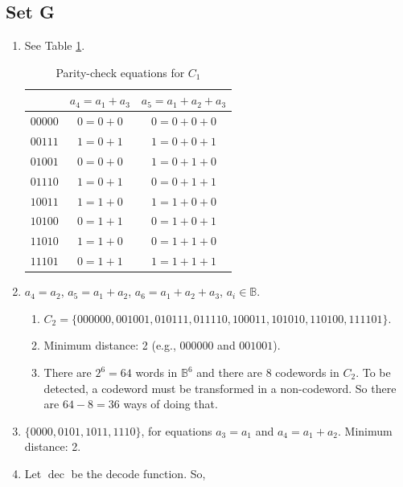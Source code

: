 \documentclass{article}
\DeclareMathOperator{\dec}{dec}
\begin{document}
\subsection{Set G}
\begin{enumerate}
    \item See Table \ref{tab:parity-c1}.
        \begin{table}[!hb]
            \centering
            \begin{tabular}{c|c|c}
                                        & $a_4 = a_1 + a_3$ & $a_5 = a_1 + a_2 + a_3$ \\ \hline
            $00000$ & $0 = 0 + 0$       & $0 = 0 + 0 + 0$         \\
            $00111$ & $1 = 0 + 1$       & $1 = 0 + 0 + 1$         \\
            $01001$ & $0 = 0 + 0$       & $1 = 0 + 1 + 0$         \\
            $01110$ & $1 = 0 + 1$       & $0 = 0 + 1 + 1$         \\
            $10011$ & $1 = 1 + 0$       & $1 = 1 + 0 + 0$         \\
            $10100$ & $0 = 1 + 1$       & $0 = 1 + 0 + 1$         \\
            $11010$ & $1 = 1 + 0$       & $0 = 1 + 1 + 0$         \\
            $11101$ & $0 = 1 + 1$       & $1 = 1 + 1 + 1$        
            \end{tabular}
            \caption{Parity-check equations for $C_1$}
            \label{tab:parity-c1}
        \end{table}
    \item $a_4 = a_2$, $a_5 = a_1 + a_2$, $a_6 = a_1 + a_2 + a_3$, $a_i \in \mathbb{B}$.
        \begin{enumerate}
            \item $C_2 = \{000000, 001001, 010111, 011110, 100011, 101010, 110100, 111101\}$.
            \item Minimum distance: 2 (e.g., $000000$ and $001001$).
            \item There are $2^6 = 64$ words in $\mathbb{B}^6$ and there are $8$ codewords in $C_2$.
            To be detected, a codeword must be transformed in a non-codeword. So there are $64 - 8 = 36$ ways of doing that.
        \end{enumerate}
    \item $\{0000, 0101, 1011, 1110\}$, for equations $a_3 = a_1$ and $a_4 = a_1 + a_2$. Minimum distance: 2.
    \item Let $\dec$ be the decode function. So,

\end{enumerate}
\end{document}
